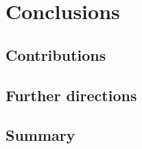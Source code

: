 \chapter{Conclusions}
\label{cha:Conclusions}

\section{Contributions}
\label{sec:Contributions}

\section{Further directions}
\label{sec:Further directions}

\section{Summary}
\label{sec:Summary}
